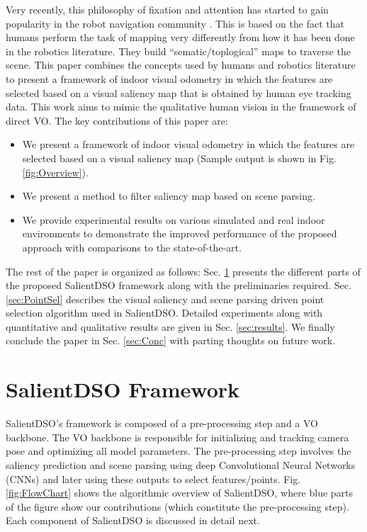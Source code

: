 \documentclass[letterpaper, 10 pt, conference]{ieeeconf}  %
\begin{document}
Very recently, this philosophy of fixation and attention has started to gain popularity in the robot navigation community \cite{SemanticSLAM, KostasSemanticSLAM, an2017semantic, alexis}. This is based on the fact that humans perform the task of mapping very differently from how it has been done in the robotics literature. They build ``sematic/toplogical'' maps to traverse the scene. This paper combines the concepts used by humans and robotics literature to present a framework of indoor visual odometry in which the features are selected based on a visual saliency map that is obtained by human eye tracking data. This work aims to mimic the qualitative human vision in the framework of direct VO. The key contributions of this paper are:

\begin{itemize}
    \item We present a framework of indoor visual odometry in which the features are selected based on a visual saliency map (Sample output is shown in Fig. \ref{fig:Overview}).
    \item We present a method to filter saliency map based on scene parsing.
    \item We provide experimental results on various simulated and real indoor environments to demonstrate the improved performance of the proposed approach with comparisons to the state-of-the-art.
\end{itemize}
The rest of the paper is organized as follows: Sec. \ref{sec:SalientDSO} presents the different parts of the proposed SalientDSO framework along with the preliminaries required. Sec. \ref{sec:PointSel} describes the visual saliency and scene parsing driven point selection algorithm used in SalientDSO. Detailed experiments along with quantitative and qualitative results are given in Sec. \ref{sec:results}. We finally conclude the paper in Sec. \ref{sec:Conc} with parting thoughts on future work.

\section{SalientDSO Framework}
\label{sec:SalientDSO}
SalientDSO's framework is composed of a pre-processing step and a VO backbone. The VO backbone is responsible for initializing and tracking camera pose and optimizing all model parameters. The pre-processing step involves the saliency prediction and scene parsing using  deep Convolutional Neural Networks (CNNs) and later using these outputs to select features/points. Fig. \ref{fig:FlowChart} shows the algorithmic overview of SalientDSO, where blue parts of the figure show our contributions (which constitute the pre-processing step). Each component of SalientDSO is discussed in detail next.\\
\end{document}
